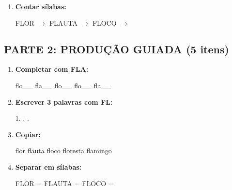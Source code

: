\begin{exercicio}
\begin{enumerate}
  \item \textbf{Contar sílabas:}
  \begin{center}
  FLOR $\rightarrow$ \underline{\hspace{0.9cm}} \quad FLAUTA $\rightarrow$ \underline{\hspace{0.9cm}} \quad FLOCO $\rightarrow$ \underline{\hspace{0.9cm}}
  \end{center}

\end{enumerate}

\subsection*{PARTE 2: PRODUÇÃO GUIADA (5 itens)}

\begin{enumerate}[resume]

  \item \textbf{Completar com FLA:}
  \begin{center}
  flo\underline{~~~} \quad fla\underline{~~~} \quad flo\underline{~~~} \quad flo\underline{~~~} \quad fla\underline{~~~}
  \end{center}

  \item \textbf{Escrever 3 palavras com FL:}
  \begin{center}
  1. \underline{\hspace{3cm}} . \underline{\hspace{3cm}} . \underline{\hspace{3cm}}
  \end{center}

  \item \textbf{Copiar:}
  \begin{center}
  flor \quad flauta \quad floco \quad floresta \quad flamingo
  \end{center}

  \item \textbf{Separar em sílabas:}
  \begin{center}
  FLOR = \underline{\hspace{1cm}} \underline{\hspace{1cm}} \quad FLAUTA = \underline{\hspace{1cm}} \underline{\hspace{1cm}} \quad FLOCO = \underline{\hspace{1cm}} \underline{\hspace{1cm}}
  \end{center}


\end{enumerate}
\end{exercicio}
